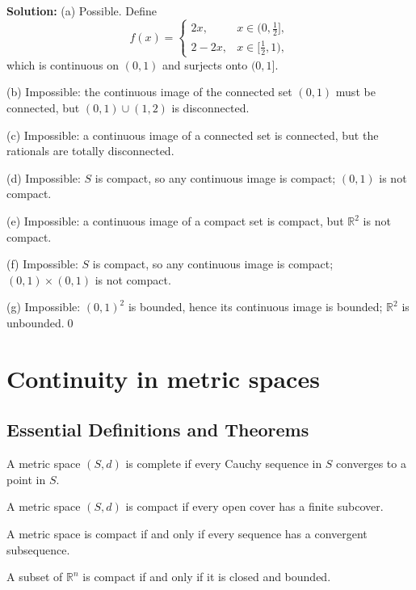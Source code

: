 \bigskip\noindent\textbf{Solution:}
(a) Possible. Define
\[
f(x)=\begin{cases}
2x,& x\in(0,\tfrac12],\\
2-2x,& x\in[\tfrac12,1),
\end{cases}
\]
which is continuous on $(0,1)$ and surjects onto $(0,1]$.

(b) Impossible: the continuous image of the connected set $(0,1)$ must be connected, but $(0,1)\cup(1,2)$ is disconnected.

(c) Impossible: a continuous image of a connected set is connected, but the rationals are totally disconnected.

(d) Impossible: $S$ is compact, so any continuous image is compact; $(0,1)$ is not compact.

(e) Impossible: a continuous image of a compact set is compact, but $\mathbb{R}^2$ is not compact.

(f) Impossible: $S$ is compact, so any continuous image is compact; $(0,1)\times(0,1)$ is not compact.

(g) Impossible: $(0,1)^2$ is bounded, hence its continuous image is bounded; $\mathbb{R}^2$ is unbounded.\qed

\section{Continuity in metric spaces}

\subsection*{Essential Definitions and Theorems}

\begin{definition}
A metric space $(S,d)$ is complete if every Cauchy sequence in $S$ converges to a point in $S$.
\end{definition}

\begin{definition}
A metric space $(S,d)$ is compact if every open cover has a finite subcover.
\end{definition}

\begin{theorem}
A metric space is compact if and only if every sequence has a convergent subsequence.
\end{theorem}

\begin{theorem}
A subset of $\mathbb{R}^n$ is compact if and only if it is closed and bounded.
\end{theorem}

